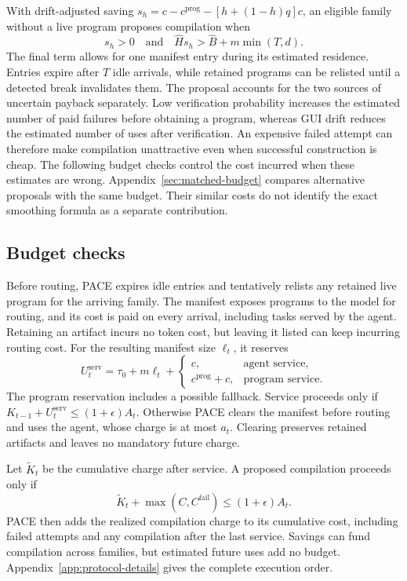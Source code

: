 With drift-adjusted saving $s_h=c-c^{\mathrm{prog}}-[h+(1-h)q]c$, an eligible family without a live program proposes compilation when
\begin{equation}
s_h>0\quad\text{and}\quad\hat Hs_h>\hat B+m\min(T,d).
\label{eq:trigger}
\end{equation}
The final term allows for one manifest entry during its estimated residence.
Entries expire after $T$ idle arrivals, while retained programs can be relisted until a detected break invalidates them.
The proposal accounts for the two sources of uncertain payback separately.
Low verification probability increases the estimated number of paid failures before obtaining a program, whereas GUI drift reduces the estimated number of uses after verification.
An expensive failed attempt can therefore make compilation unattractive even when successful construction is cheap.
The following budget checks control the cost incurred when these estimates are wrong.
Appendix~\ref{sec:matched-budget} compares alternative proposals with the same budget.
Their similar costs do not identify the exact smoothing formula as a separate contribution.

\subsection{Budget checks}
\label{sec:cost-protection}

Before routing, PACE expires idle entries and tentatively relists any retained live program for the arriving family.
The manifest exposes programs to the model for routing, and its cost is paid on every arrival, including tasks served by the agent.
Retaining an artifact incurs no token cost, but leaving it listed can keep incurring routing cost.
For the resulting manifest size $\ell_t$, it reserves
\begin{equation}
U_t^{\mathrm{serv}}=\tau_0+m\ell_t+
\begin{cases}
c,&\text{agent service},\\
c^{\mathrm{prog}}+c,&\text{program service}.
\end{cases}
\label{eq:service-reserve}
\end{equation}
The program reservation includes a possible fallback.
Service proceeds only if $K_{t-1}+U_t^{\mathrm{serv}}\leq(1+\epsilon)A_t$.
Otherwise PACE clears the manifest before routing and uses the agent, whose charge is at most $a_t$.
Clearing preserves retained artifacts and leaves no mandatory future charge.

Let $\widetilde K_t$ be the cumulative charge after service.
A proposed compilation proceeds only if
\begin{equation}
\widetilde K_t+\max(C,C^{\mathrm{fail}})\leq(1+\epsilon)A_t.
\label{eq:compile-admission}
\end{equation}
PACE then adds the realized compilation charge to its cumulative cost, including failed attempts and any compilation after the last service.
Savings can fund compilation across families, but estimated future uses add no budget.
Appendix~\ref{app:protocol-details} gives the complete execution order.

